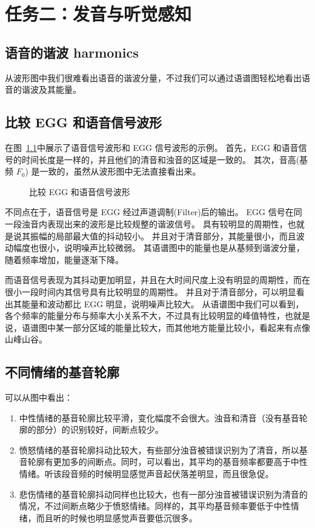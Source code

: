 \chapter{任务二：发音与听觉感知}
\label{chap:task2}

\section{语音的谐波 harmonics}
从波形图中我们很难看出语音的谐波分量，不过我们可以通过语谱图轻松地看出语音的谐波及其能量。

\section{比较 EGG 和语音信号波形}
在图~\ref{fig:waveforms_speech_EGG}中展示了语音信号波形和 EGG 信号波形的示例。
首先，EGG 和语音信号的时间长度是一样的，并且他们的清音和浊音的区域是一致的。
其次，音高(基频 $F_0$) 是一致的，虽然从波形图中无法直接看出来。

\begin{figure}[htp]
    \caption{比较 EGG 和语音信号波形}
    \label{fig:waveforms_speech_EGG}
\end{figure}

不同点在于，语音信号是 EGG 经过声道调制(Filter)后的输出。
EGG 信号在同一段浊音内表现出来的波形是比较规整的谐波信号。
具有较明显的周期性，也就是说其振幅的局部最大值的抖动较小。
并且对于清音部分，其能量很小，而且波动幅度也很小，说明噪声比较微弱。
其语谱图中的能量也是从基频到谐波分量，随着频率增加，能量逐渐下降。

而语音信号表现为其抖动更加明显，并且在大时间尺度上没有明显的周期性，而在很小一段时间内其信号具有比较明显的周期性。
并且对于清音部分，可以明显看出其能量和波动都比 EGG 明显，说明噪声比较大。
从语谱图中我们可以看到，各个频率的能量分布与频率大小关系不大，不过具有比较明显的峰值特性，也就是说，语谱图中某一部分区域的能量比较大，而其他地方能量比较小，看起来有点像山峰山谷。

\section{不同情绪的基音轮廓}
可以从图中看出：

\begin{enumerate}
    \item 中性情绪的基音轮廓比较平滑，变化幅度不会很大。浊音和清音（没有基音轮廓的部分）的识别较好，间断点较少。
    \item 愤怒情绪的基音轮廓抖动比较大，有些部分浊音被错误识别为了清音，所以基音轮廓有更加多的间断点。同时，可以看出，其平均的基音频率都要高于中性情绪。听该段音频的时候明显感觉声音起伏落差明显，而且很急促。
    \item 悲伤情绪的基音轮廓抖动同样也比较大，也有一部分浊音被错误识别为清音的情况，不过间断点略少于愤怒情绪。同样的，其平均基音频率要低于中性情绪，而且听的时候也明显感觉声音要低沉很多。
\end{enumerate}

